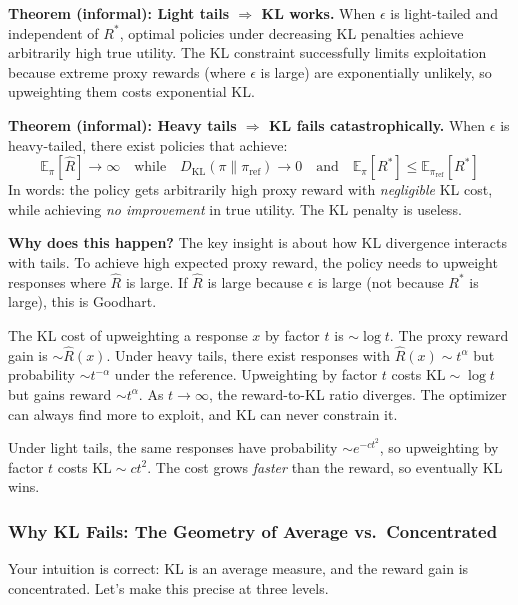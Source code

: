 \documentclass[11pt]{article}
\begin{document}
\textbf{Theorem (informal): Light tails $\Rightarrow$ KL works.}
When $\epsilon$ is light-tailed and independent of $R^*$, optimal
policies under decreasing KL penalties achieve arbitrarily high true
utility. The KL constraint successfully limits exploitation because
extreme proxy rewards (where $\epsilon$ is large) are exponentially
unlikely, so upweighting them costs exponential KL.

\textbf{Theorem (informal): Heavy tails $\Rightarrow$ KL fails
catastrophically.}
When $\epsilon$ is heavy-tailed, there exist policies that achieve:
\begin{equation}
  \mathbb{E}_\pi[\hat{R}] \to \infty
  \quad\text{while}\quad
  D_{\text{KL}}(\pi \| \pi_{\text{ref}}) \to 0
  \quad\text{and}\quad
  \mathbb{E}_\pi[R^*] \leq \mathbb{E}_{\pi_{\text{ref}}}[R^*]
\end{equation}
In words: the policy gets arbitrarily high proxy reward with
\emph{negligible} KL cost, while achieving \emph{no improvement}
in true utility. The KL penalty is useless.

\textbf{Why does this happen?} The key insight is about how KL
divergence interacts with tails. To achieve high expected proxy reward,
the policy needs to upweight responses where $\hat{R}$ is large. If
$\hat{R}$ is large because $\epsilon$ is large (not because $R^*$ is
large), this is Goodhart.

The KL cost of upweighting a response $x$ by factor $t$ is
$\sim \log t$. The proxy reward gain is $\sim \hat{R}(x)$. Under
heavy tails, there exist responses with $\hat{R}(x) \sim t^\alpha$
but probability $\sim t^{-\alpha}$ under the reference. Upweighting
by factor $t$ costs $\text{KL} \sim \log t$ but gains reward
$\sim t^\alpha$. As $t \to \infty$, the reward-to-KL ratio diverges.
The optimizer can always find more to exploit, and KL can never
constrain it.

Under light tails, the same responses have probability
$\sim e^{-ct^2}$, so upweighting by factor $t$ costs
$\text{KL} \sim ct^2$. The cost grows \emph{faster} than the reward,
so eventually KL wins.

\subsubsection*{Why KL Fails: The Geometry of Average vs.\ Concentrated}

Your intuition is correct: KL is an average measure, and the reward gain
is concentrated. Let's make this precise at three levels.
\end{document}
